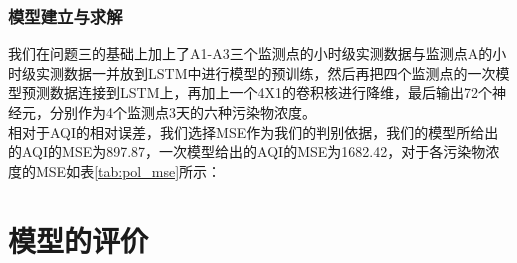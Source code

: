 \documentclass[bwprint]{gmcmthesis}
\numberwithin{figure}{section}
\begin{document}
\subsubsection{模型建立与求解}
我们在问题三的基础上加上了A1-A3三个监测点的小时级实测数据与监测点A的小时级实测数据一并放到LSTM中进行模型的预训练，然后再把四个监测点的一次模型预测数据连接到LSTM上，再加上一个4X1的卷积核进行降维，最后输出72个神经元，分别作为4个监测点3天的六种污染物浓度。\\
相对于AQI的相对误差，我们选择MSE作为我们的判别依据，我们的模型所给出的AQI的MSE为897.87，一次模型给出的AQI的MSE为1682.42，对于各污染物浓度的MSE如表\ref{tab:pol_mse}所示：
\begin{table}
	\caption{各污染物浓度MSE}\label{tab:pol_mse}
	\begin{center}
	\end{center}
\end{table}
\section{模型的评价}
\end{document}

